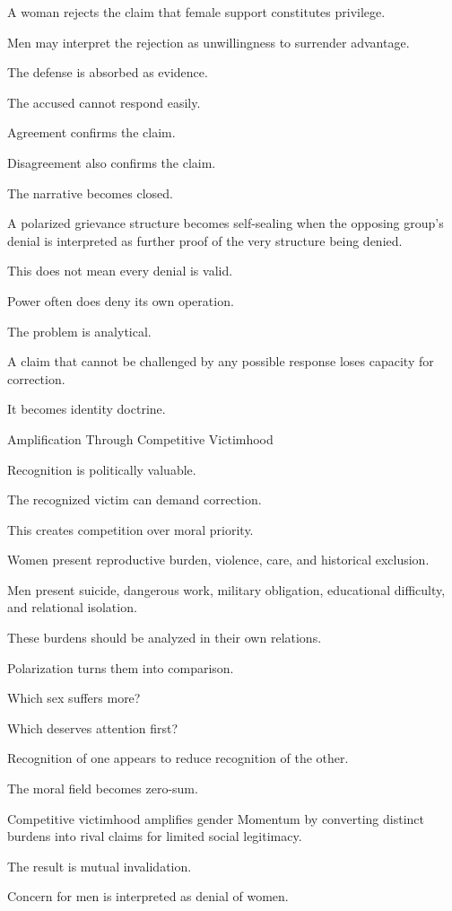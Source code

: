 A woman rejects the claim that female support constitutes privilege.

Men may interpret the rejection as unwillingness to surrender advantage.

The defense is absorbed as evidence.

The accused cannot respond easily.

Agreement confirms the claim.

Disagreement also confirms the claim.

The narrative becomes closed.

A polarized grievance structure becomes self-sealing when the opposing group’s denial is interpreted as further proof of the very structure being denied.

This does not mean every denial is valid.

Power often does deny its own operation.

The problem is analytical.

A claim that cannot be challenged by any possible response loses capacity for correction.

It becomes identity doctrine.

Amplification Through Competitive Victimhood

Recognition is politically valuable.

The recognized victim can demand correction.

This creates competition over moral priority.

Women present reproductive burden, violence, care, and historical exclusion.

Men present suicide, dangerous work, military obligation, educational difficulty, and relational isolation.

These burdens should be analyzed in their own relations.

Polarization turns them into comparison.

Which sex suffers more?

Which deserves attention first?

Recognition of one appears to reduce recognition of the other.

The moral field becomes zero-sum.

Competitive victimhood amplifies gender Momentum by converting distinct burdens into rival claims for limited social legitimacy.

The result is mutual invalidation.

Concern for men is interpreted as denial of women.

